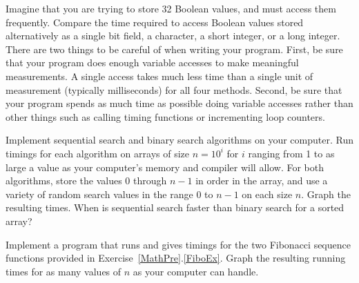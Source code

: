 \begin{projects}

\item
{}
Imagine that you are trying to store 32 Boolean values, and must
access them frequently.
Compare the time required to access Boolean values stored
alternatively as a single bit field, a character, a short integer, or
a long integer.
There are two things to be careful of when writing your program.
First, be sure that your program does enough variable accesses to make
meaningful measurements.
A single access takes much less time than a single unit of measurement
(typically milliseconds) for all four methods.
Second, be sure that your program spends as much time as possible
doing variable accesses rather than other things such as calling
timing functions or incrementing  loop counters.

\item
{}
Implement sequential search and binary search algorithms on your
computer.
Run timings for each algorithm on arrays of size \(n = 10^i\) for
\(i\) ranging from 1 to as large a value as your computer's memory and 
compiler will allow.
For both algorithms, store the values 0 through \(n-1\) in order in
the array, and use a variety of random search values in the range 0 to
\(n-1\) on each size \(n\).
Graph the resulting times.
When is sequential search faster than binary search for a sorted array?

\item
Implement a program that runs and gives timings for the two Fibonacci
sequence functions provided in Exercise~\ref{MathPre}.\ref{FiboEx}.
Graph the resulting running times for as many values of \(n\) as your
computer can handle.

\end{projects}
